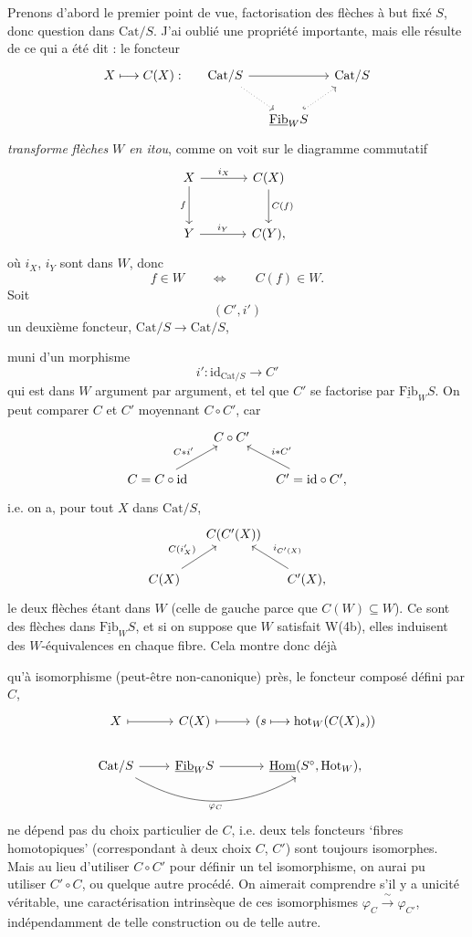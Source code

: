 \documentclass[11pt]{article}
\newcommand{\printedpage}[1]{\marginpar{\footnotesize p.~#1}}
\newcommand{\msp}[1]{\marginpar{\footnotesize [#1]}}
\newcommand{\Fib}{\underline{\mathrm{Fib}}}
\newcommand{\Hom}{\underline{\mathrm{Hom}}}
\newcommand{\Cat}{\mathrm{Cat}}
\begin{document}
Prenons d'abord le premier point de vue, factorisation des flèches à but fixé $S$, donc question dans $\Cat/S$. J'ai oublié une propriété importante, mais elle résulte de ce qui a été dit : le foncteur
\[
\begin{tikzcd}[column sep=small]
X \longmapsto C(X) : & \Cat/S \arrow[rr] \arrow[dr, dotted] & & \Cat/S \\
& & \Fib_W S \arrow[ur, dotted, hook] &
\end{tikzcd}
\]
\textit{transforme} \textit{flèches} \textit{$W$ en itou}, comme on voit sur le diagramme commutatif
\[
\begin{tikzcd}[row sep=large, column sep=large]
X \arrow[r, "i_X"] \arrow[d, "f"'] & C(X) \arrow[d, "C(f)"] \\
Y \arrow[r, "i_Y"] & C(Y),
\end{tikzcd}
\]
où $i_X$, $i_Y$ sont dans $W$, donc
\[
f \in W \qquad \Longleftrightarrow \qquad C(f) \in W.
\]
Soit
\[
(C',i')
\]
un deuxième foncteur, $\Cat/S \longrightarrow \Cat/S$,

\msp{page 195}
muni d'un morphisme
\[
i' : \mathrm{id}_{\Cat/S} \longrightarrow C'
\]
qui est dans $W$ argument par argument, et tel que $C'$ se factorise par $\Fib_W S$. On peut comparer $C$ et $C'$ moyennant $C \circ C'$, car
\[
\begin{tikzcd}[column sep=small]
& C \circ C' & \\
C = C \circ \mathrm{id} \arrow[ur, "C\ast i'"] & & C' = \mathrm{id} \circ C', \arrow[ul, "i\ast C'"']
\end{tikzcd}
\]
\printedpage{129}
i.e. on a, pour tout $X$ dans $\Cat/S$,
\[
\begin{tikzcd}[column sep=small]
& C(C'(X)) & \\
C(X) \arrow[ur, "C(i'_X)"] & & C'(X), \arrow[ul, "i_{C'(X)}"']
\end{tikzcd}
\]
le deux flèches étant dans $W$ (celle de gauche parce que $C(W) \subseteq W$). Ce sont des flèches dans $\Fib_W S$, et si on suppose que $W$ satisfait W(4b), elles induisent des $W$-équivalences en chaque fibre. Cela montre donc déjà %

\msp{page 196}
qu'à isomorphisme (peut-être non-canonique) près, le foncteur composé défini par $C$,
\[
\begin{tikzcd}
X \arrow[r, mapsto] & C(X) \arrow[r, mapsto] & (s \longmapsto \mathrm{hot}_W(C(X)_s)) \\
\Cat/S \arrow[r] \arrow[rr, bend right, "\varphi_C"'] & \Fib_W S \arrow[r] & \Hom(S^\circ,\mathrm{Hot}_W),
\end{tikzcd}
\]
ne dépend pas du choix particulier de $C$, i.e. deux tels foncteurs `fibres homotopiques' (correspondant à deux choix $C$, $C'$) sont toujours isomorphes. Mais au lieu d'utiliser $C \circ C'$ pour définir un tel isomorphisme, on aurai pu utiliser $C' \circ C$, ou quelque autre procédé. On aimerait comprendre s'il y a unicité véritable, une caractérisation intrinsèque de ces isomorphismes $\varphi_C \xrightarrow{\ \sim\ } \varphi_{C'}$, indépendamment de telle construction ou de telle autre. %
\end{document}
